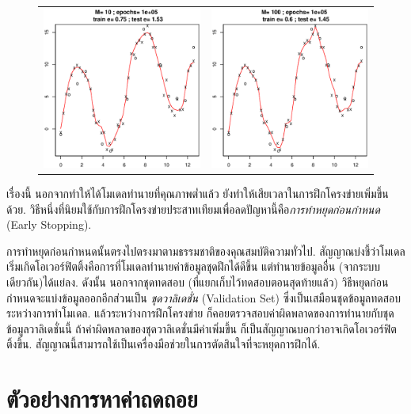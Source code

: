 \begin{figure}[htp]
\begin{tabular}{cc}
    \includegraphics[width=60mm]{04ANN/simpleM10E100000.eps}&    
    \includegraphics[width=60mm]{04ANN/simpleM100E100000.eps}           
  \end{tabular}
\end{figure}

เรื่องนี้ นอกจากทำให้ได้โมเดลทำนายที่คุณภาพต่ำแล้ว ยังทำให้เสียเวลาในการฝึกโครงข่ายเพิ่มขึ้นด้วย.
วิธีหนึ่งที่นิยมใช้กับการฝึกโครงข่ายประสาทเทียมเพื่อลดปัญหานี้คือ\textit{การทำหยุดก่อนกำหนด} (Early Stopping).

การทำหยุดก่อนกำหนดนั้นตรงไปตรงมาตามธรรมชาติของคุณสมบัติความทั่วไป.
สัญญาณบ่งชี้ว่าโมเดลเริ่มเกิดโอเวอร์ฟิตติ้งคือการที่โมเดลทำนายค่าข้อมูลชุดฝึกได้ดีขึ้น 
แต่ทำนายข้อมูลอื่น (จากระบบเดียวกัน)ได้แย่ลง.
ดังนั้น นอกจากชุดทดสอบ (ที่แยกเก็บไว้ทดสอบตอนสุดท้ายแล้ว) วิธีหยุดก่อนกำหนดจะแบ่งข้อมูลออกอีกส่วนเป็น  \textit{ชุดวาลิเดชั่น} (Validation Set) ซึ่งเป็นเสมือนชุดข้อมูลทดสอบระหว่างการทำโมเดล.
แล้วระหว่างการฝึกโครงข่าย ก็คอยตรวจสอบค่าผิดพลาดของการทำนายกับชุดข้อมูลวาลิเดชั่นนี้ ถ้าค่าผิดพลาดของชุดวาลิเดชั่นมีค่าเพิ่มขึ้น ก็เป็นสัญญาณบอกว่าอาจเกิดโอเวอร์ฟิตติ้งขึ้น.
สัญญาณนี้สามารถใช้เป็นเครื่องมือช่วยในการตัดสินใจที่จะหยุดการฝึกได้.

\section{ตัวอย่างการหาค่าถดถอย}

